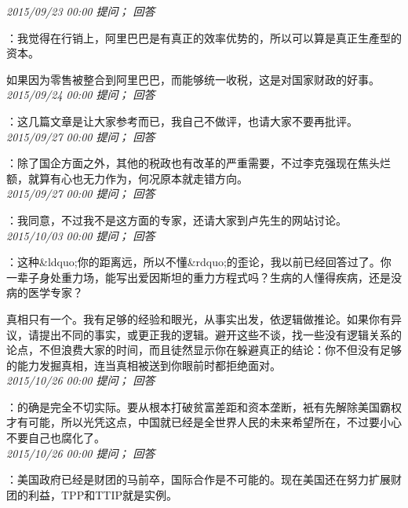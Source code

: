 \documentclass[twocolumn]{ctexart}
\begin{document}
\textit{\hfill\noindent\small 2015/09/23 00:00 提问； 回答}

：我觉得在行销上，阿里巴巴是有真正的效率优势的，所以可以算是真正生產型的资本。

如果因为零售被整合到阿里巴巴，而能够统一收税，这是对国家财政的好事。\\

\textit{\hfill\noindent\small 2015/09/24 00:00 提问； 回答}

：这几篇文章是让大家参考而已，我自己不做评，也请大家不要再批评。\\

\textit{\hfill\noindent\small 2015/09/27 00:00 提问； 回答}

：除了国企方面之外，其他的税政也有改革的严重需要，不过李克强现在焦头烂额，就算有心也无力作为，何况原本就走错方向。\\

\textit{\hfill\noindent\small 2015/09/27 00:00 提问； 回答}

：我同意，不过我不是这方面的专家，还请大家到卢先生的网站讨论。\\

\textit{\hfill\noindent\small 2015/10/03 00:00 提问； 回答}

：这种\&ldquo;你的距离远，所以不懂\&rdquo;的歪论，我以前已经回答过了。你一辈子身处重力场，能写出爱因斯坦的重力方程式吗？生病的人懂得疾病，还是没病的医学专家？

真相只有一个。我有足够的经验和眼光，从事实出发，依逻辑做推论。如果你有异议，请提出不同的事实，或更正我的逻辑。避开这些不谈，找一些没有逻辑关系的论点，不但浪费大家的时间，而且徒然显示你在躲避真正的结论：你不但没有足够的能力发掘真相，连当真相被送到你眼前时都拒绝面对。\\

\textit{\hfill\noindent\small 2015/10/26 00:00 提问； 回答}

：的确是完全不切实际。要从根本打破贫富差距和资本垄断，衹有先解除美国霸权才有可能，所以光凭这点，中国就已经是全世界人民的未来希望所在，不过要小心不要自己也腐化了。\\

\textit{\hfill\noindent\small 2015/10/26 00:00 提问； 回答}

：美国政府已经是财团的马前卒，国际合作是不可能的。现在美国还在努力扩展财团的利益，TPP和TTIP就是实例。\\
\end{document}
